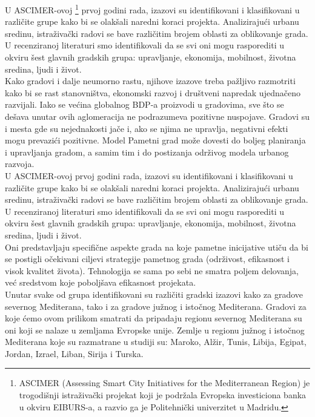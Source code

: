 \documentclass[a4paper,12pt]{article}
\begin{document}
{U ASCIMER-ovoj \footnote{ASCIMER (Assessing Smart City Initiatives for the Mediterranean Region) je trogodišnji istraživački projekat koji je podržala Evropska investiciona banka u okviru EIBURS-a, a razvio ga je Politehnički univerzitet u Madridu.} prvoj godini rada, izazovi su identifikovani i klasifikovani u različite grupe kako bi se olakšali naredni koraci projekta. Analizirajući urbanu sredinu, istraživački radovi se bave različitim brojem oblasti za oblikovanje grada. U recenziranoj literaturi smo identifikovali da se svi oni mogu rasporediti u okviru šest glavnih gradskih grupa: upravljanje, ekonomija, mobilnost, životna sredina, ljudi i život. \\

 Kako gradovi i dalje neumorno rastu, njihove izazove treba pažljivo razmotriti kako bi se rast stanovništva, ekonomski razvoj i društveni napredak ujednačeno razvijali. Iako se većina globalnog BDP-a proizvodi u gradovima, sve što se dešava unutar ovih aglomeracija ne podrazumeva pozitivne nuspojave. Gradovi su i mesta gde su nejednakosti jače i, ako se njima ne upravlja, negativni efekti mogu prevazići pozitivne. Model Pametni grad može dovesti do boljeg planiranja i upravljanja gradom, a samim tim i do postizanja održivog modela urbanog razvoja. \\

U ASCIMER-ovoj prvoj godini rada, izazovi su identifikovani i klasifikovani u različite grupe kako bi se olakšali naredni koraci projekta. Analizirajući urbanu sredinu, istraživački radovi se bave različitim brojem oblasti za oblikovanje grada. U recenziranoj literaturi smo identifikovali da se svi oni mogu rasporediti u okviru šest glavnih gradskih grupa: upravljanje, ekonomija, mobilnost, životna sredina, ljudi i život. \\


Oni predstavljaju specifične aspekte grada na koje pametne inicijative utiču da bi se postigli očekivani ciljevi strategije pametnog grada (održivost, efikasnost i visok kvalitet života). Tehnologija se sama po sebi ne smatra poljem delovanja, već sredstvom koje poboljšava efikasnost projekata. \\

Unutar svake od grupa identifikovani su različiti gradski izazovi kako za gradove severnog Mediterana, tako i za gradove južnog i istočnog Mediterana. Gradovi za koje ćemo ovom prilikom smatrati da pripadaju regionu severnog Mediterana su oni koji se nalaze u zemljama Evropske unije. Zemlje u regionu južnog i istočnog Mediterana koje su razmatrane u studiji su: Maroko, Alžir, Tunis, Libija, Egipat, Jordan, Izrael, Liban, Sirija i Turska. \\

}
\end{document}
